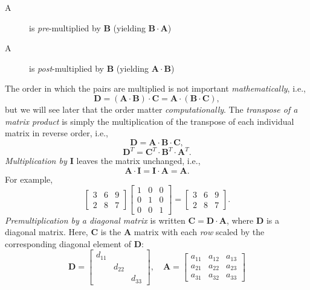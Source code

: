 \begin{description}
\item [A] is \emph{pre}-multiplied by $\mathbf{B}$ (yielding $\mathbf{B \cdot  A}$)
\item [A] is \emph{post}-multiplied by $\mathbf{B}$ (yielding $\mathbf{ A \cdot B}$)
\end{description}

The order in which the pairs are multiplied is not important \emph{mathematically}, i.e.,
\begin{equation}
\mathbf{ D = (A \cdot B) \cdot C = A \cdot (B \cdot C)},
\end{equation}
but we will see later that the order matter \emph{computationally}.
The \emph{transpose of a matrix product} is simply the multiplication of the transpose of each individual matrix in 
reverse order, i.e.,
\begin{equation}
\mathbf{D = A \cdot B \cdot C},
\end{equation}
\begin{equation}
\mathbf{D}^T = \mathbf{C}^T \cdot \mathbf{B}^T \cdot \mathbf{A}^T.
\label{eq:transposerule}
\end{equation}
\emph{Multiplication by $\mathbf{I}$} leaves the matrix unchanged, i.e.,
\begin{equation}
\mathbf{A \cdot I = I \cdot A = A}.
\end{equation}
For example, 
\begin{equation}
\left[ \begin{array}{ccc}
3 & 6 & 9 \\
2 & 8 & 7 
\end{array} \right]
\left[ \begin{array}{ccc}
1 & 0 & 0\\
0 & 1 & 0\\
0 & 0 & 1 \end{array}
\right]
 = 
\left[
\begin{array}{ccc}
3 & 6 & 9 \\
2 & 8 & 7
\end{array}
\right] .
\end{equation}
\emph{Premultiplication by a diagonal matrix} is written
$\mathbf{C = D \cdot A}$,
where $\mathbf{D}$  is  a diagonal matrix. Here, $\mathbf{C}$  is the $\mathbf{A}$ matrix with each \emph{row} scaled by the corresponding diagonal 
element of $\mathbf{D}$:
\begin{equation}
\mathbf{D}   =  \left[ \begin{array}{ccc}
d_{11}\\
& d_{22} \\
& & d_{33}
\end{array} \right] ,    \quad  \mathbf{A} = \left[ \begin{array}{ccc}
a_{11} & a_{12} & a_{13}\\
a_{21} & a_{22} & a_{23}\\
a_{31} & a_{32} & a_{33}
\end{array} \right ]
\end{equation}
